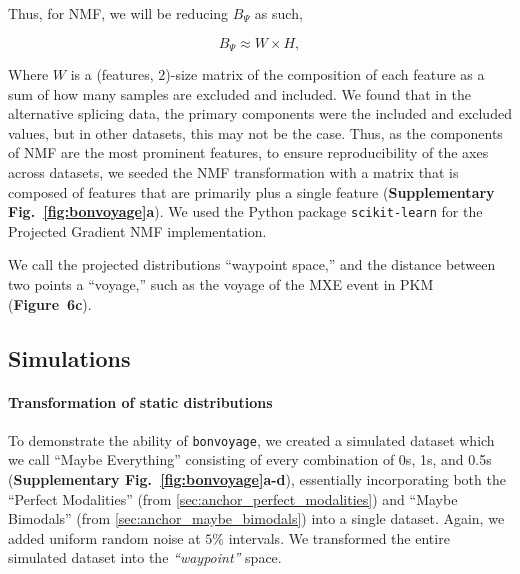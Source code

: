 Thus, for NMF, we will be reducing $B_\Psi$ as such,

\begin{equation}
B_\Psi \approx W \times H,
\end{equation}

Where $W$ is a (features, $2$)-size matrix of the composition of each feature as a sum of how many samples are excluded and included. We found that in the alternative splicing data, the primary components were the included and excluded values, but in other datasets, this may not be the case. Thus, as the components of NMF are the most prominent features, to ensure reproducibility of the axes across datasets, we seeded the NMF transformation with a matrix that is composed of features that are primarily \0 plus a single \1 feature (\textbf{Supplementary Fig.~\ref{fig:bonvoyage}a}). We used the Python package \texttt{scikit-learn} \cite{Pedregosa:2011tv} for the Projected Gradient NMF implementation. 

We call the projected distributions ``waypoint space,'' and the distance between two points a ``voyage,'' such as the voyage of the MXE event in PKM (\textbf{Figure~6c}). 


\subsection{Simulations}
\label{subsubsec:bonvoyage_simulations}


\paragraph{Transformation of static distributions}

To demonstrate the ability of \texttt{bonvoyage}, we created a simulated dataset which we call ``Maybe Everything'' consisting of every combination of 0s, 1s, and 0.5s (\textbf{Supplementary Fig.~\ref{fig:bonvoyage}a-d}), essentially incorporating both the ``Perfect Modalities'' (from \ref{sec:anchor_perfect_modalities}) and ``Maybe Bimodals'' (from \ref{sec:anchor_maybe_bimodals}) into a single dataset. Again, we added uniform random noise at $5\%$ intervals. We transformed the entire simulated dataset into the \emph{``waypoint''} space.


